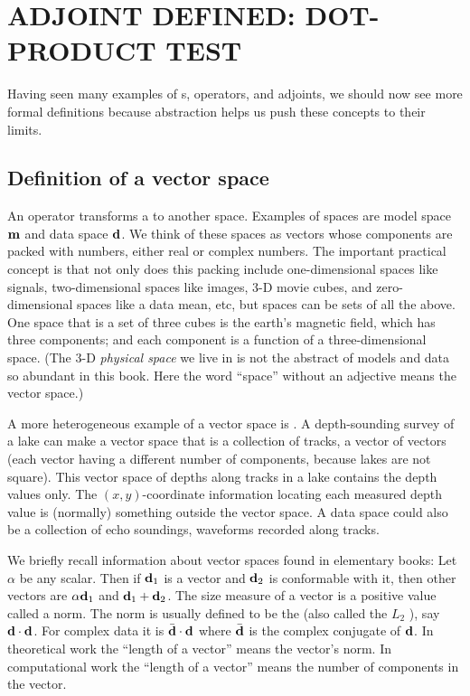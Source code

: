 

\section{ADJOINT DEFINED: DOT-PRODUCT TEST}

Having seen many examples of s, operators, and adjoints,
we should now see more formal definitions
because abstraction
helps us push these concepts to their limits.

\subsection{Definition of a vector space}
An operator transforms a  to another space.
Examples of spaces are model space $\bold m$
and data space $\bold d$.
We think of these spaces as vectors
whose components are packed with numbers,
either real or complex numbers.
The important practical concept is that
not only does this packing include one-dimensional spaces like signals,
two-dimensional spaces like images, 3-D movie cubes,
and zero-dimensional spaces like a data mean, etc,
but spaces can be sets of all the above.
One space that is a set of three cubes is
the earth's magnetic field, which has three components;
and each component is a function of a three-dimensional space.
(The 3-D {\em  physical space} we live in is not
the abstract {\em  {}}
of models and data so abundant in this book.
Here the word ``space'' without an adjective means the vector space.)
\par
A more heterogeneous example of a vector space is .
A depth-sounding survey of a lake can make a vector space that is
a collection of tracks,
a vector of vectors
(each vector having a different number of components,
because lakes are not square).
This vector space of depths along tracks in a lake
contains the depth values only.
The $(x,y)$-coordinate information
locating each measured depth value
is (normally) something outside the vector space.
A data space could also be a collection of echo soundings,
waveforms recorded along tracks.

\par
We briefly recall information about vector spaces found in elementary books:
Let $\alpha$ be any scalar.
Then if $\bold d_1$ is a vector and $\bold d_2$ is conformable
with it, then other vectors are
$\alpha \bold d_1$ and $\bold d_1 + \bold d_2$.
The size measure of a vector is a positive value called a norm.
The norm is usually defined to be the 
(also called the $L_2$ ), say $\bold d \cdot \bold d$.
For complex data it is
$\bar{\bold{d}} \cdot \bold{d}$
where $\bar{\bold{d}}$ is the complex conjugate of $\bold{d}$.
In theoretical work the ``length of a vector'' means the vector's norm.
In computational work the ``length of a vector'' means the
number of components in the vector.

